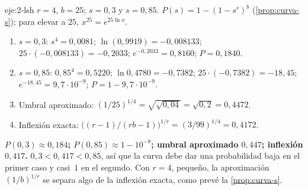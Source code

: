\begin{solucion}{eje:2-lsh}
\datos $r=4$, $b=25$; $s=0{,}3$ y $s=0{,}85$.
\planteamiento $P(s)=1-(1-s^{r})^{b}$ (\cref{prop:curva-s}); para elevar a $25$, $x^{25}=e^{25\ln x}$.
\pasos
\begin{enumerate}[label=\arabic*.]
  \item $s=0{,}3$: $s^{4}=0{,}0081$; $\ln(0{,}9919)=-0{,}008133$; $25\cdot(-0{,}008133)=-0{,}2033$; $e^{-0{,}2033}=0{,}8160$; $P=0{,}1840$.
  \item $s=0{,}85$: $0{,}85^{4}=0{,}5220$; $\ln 0{,}4780=-0{,}7382$; $25\cdot(-0{,}7382)=-18{,}45$; $e^{-18{,}45}=9{,}7\cdot 10^{-9}$; $P=1-9{,}7\cdot 10^{-9}$.
  \item Umbral aproximado: $(1/25)^{1/4}=\sqrt{\sqrt{0{,}04}}=\sqrt{0{,}2}=0{,}4472$.
  \item Inflexión exacta: $\bigl((r-1)/(rb-1)\bigr)^{1/r}=(3/99)^{1/4}=0{,}4172$.
\end{enumerate}
\resultado \textbf{$P(0{,}3)\approx 0{,}184$; $P(0{,}85)\approx 1-10^{-8}$; umbral aproximado $0{,}447$; inflexión $0{,}417$.}
\comprobacion $0{,}3<0{,}417<0{,}85$, así que la curva debe dar una probabilidad baja en el primer caso y casi~$1$ en el segundo. Con $r=4$, pequeño, la aproximación $(1/b)^{1/r}$ se separa algo de la inflexión exacta, como prevé la \cref{prop:curva-s}.
\end{solucion}

